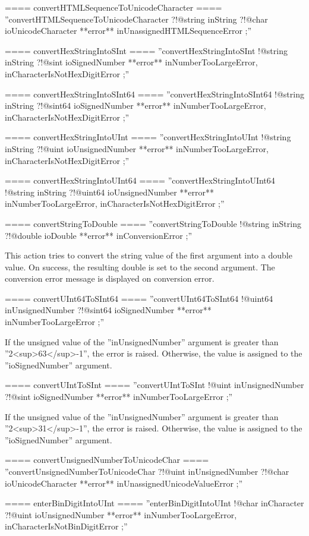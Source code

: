 ==== convertHTMLSequenceToUnicodeCharacter ====
''convertHTMLSequenceToUnicodeCharacter ?!@string inString ?!@char ioUnicodeCharacter **error** inUnassignedHTMLSequenceError ;''

==== convertHexStringIntoSInt ====
''convertHexStringIntoSInt !@string inString ?!@sint ioSignedNumber **error** inNumberTooLargeError, inCharacterIsNotHexDigitError ;''

==== convertHexStringIntoSInt64 ====
''convertHexStringIntoSInt64 !@string inString ?!@sint64 ioSignedNumber **error** inNumberTooLargeError, inCharacterIsNotHexDigitError ;''

==== convertHexStringIntoUInt ====
''convertHexStringIntoUInt !@string inString ?!@uint ioUnsignedNumber **error** inNumberTooLargeError, inCharacterIsNotHexDigitError ;''

==== convertHexStringIntoUInt64 ====
''convertHexStringIntoUInt64 !@string inString ?!@uint64 ioUnsignedNumber **error** inNumberTooLargeError, inCharacterIsNotHexDigitError ;''

==== convertStringToDouble ====
''convertStringToDouble !@string inString ?!@double ioDouble **error** inConversionError ;''

This action tries to convert the string value of the first argument into a double value. On success, the resulting double is set to the second argument. The conversion error message is displayed on conversion error.

==== convertUInt64ToSInt64 ====
''convertUInt64ToSInt64 !@uint64 inUnsignedNumber ?!@sint64 ioSignedNumber **error** inNumberTooLargeError ;''

If the unsigned value of the ''inUnsignedNumber'' argument is greater than ''2<sup>63</sup>-1'', the error is raised. Otherwise, the value is assigned to the ''ioSignedNumber'' argument.

==== convertUIntToSInt ====
''convertUIntToSInt !@uint inUnsignedNumber ?!@sint ioSignedNumber **error** inNumberTooLargeError ;''

If the unsigned value of the ''inUnsignedNumber'' argument is greater than ''2<sup>31</sup>-1'', the error is raised. Otherwise, the value is assigned to the ''ioSignedNumber'' argument.

==== convertUnsignedNumberToUnicodeChar ====
''convertUnsignedNumberToUnicodeChar ?!@uint inUnsignedNumber ?!@char ioUnicodeCharacter **error** inUnassignedUnicodeValueError ;''

==== enterBinDigitIntoUInt ====
''enterBinDigitIntoUInt !@char inCharacter ?!@uint ioUnsignedNumber **error** inNumberTooLargeError, inCharacterIsNotBinDigitError ;''

